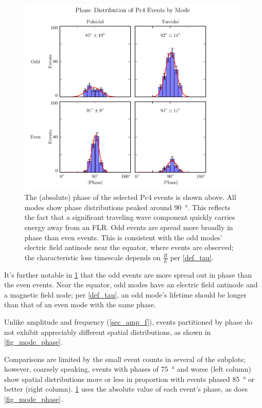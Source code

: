 \begin{figure}[!htb]
  \centering
  \includegraphics[width=\textwidth]{figures/phase.pdf}
  \caption[Phase Distribution of Pc4 Events by Mode]{
    The (absolute) phase of the selected Pc4 events is shown above. All modes
    show phase distributions peaked around \SI{90}{\degree}. This reflects the
    fact that a significant traveling wave component quickly carries energy
    away from an FLR. Odd events are spread more broadly in phase than even
    events. This is consistent with the odd modes' electric field antinode near
    the equator, where events are observed; the characteristic loss timescale
    depends on $\frac{B}{E}$ per \cref{def_tau}. 
  }
  \label{fig_phase}
\end{figure}

It's further notable in \cref{fig_phase} that the odd events are more spread
out in phase than the even events. Near the equator, odd modes have an electric
field antinode and a magnetic field node; per \cref{def_tau}, an odd mode's
lifetime should be longer than that of an even mode with the same phase. 

Unlike amplitude and frequency (\cref{sec_amp_f}), events
partitioned by phase do not exhibit appreciably different spatial
distributions, as
shown in \cref{fig_mode_phase}. 




Comparisons are limited by the small event
counts in several of the subplots; however, coarsely speaking, events with
phases of \SI{75}{\degree} and worse (left column) show spatial distributions
more or less in proportion with events phased \SI{85}{\degree} or better (right
column). \cref{fig_phase} uses the absolute value of each event's phase, as
does \cref{fig_mode_phase}. 

